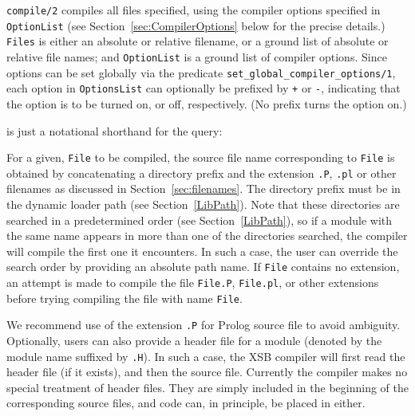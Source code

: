 \begin{description}
%
{\tt compile/2} compiles all files specified, using the compiler
options specified in {\tt OptionList} (see
Section~\ref{sec:CompilerOptions} below for the precise details.)
{\tt Files} is either an absolute or relative filename, or a ground
list of absolute or relative file names; and {\tt OptionList} is a
ground list of compiler options.  Since options can be set globally
via the predicate {\tt set\_global\_compiler\_options/1}, each option
in {\tt OptionsList} can optionally be prefixed by \verb|+| or
\verb|-|, indicating that the option is to be turned on, or off,
respectively.  (No prefix turns the option on.)


\noindent
is just a notational shorthand for the query:



For a given, {\tt File} to be compiled, the source file name
corresponding to {\tt File} is obtained by concatenating a directory
prefix and the extension {\tt .P}, {\tt .pl} or other filenames as
discussed in Section~\ref{sec:filenames}.  The directory prefix must
be in the dynamic loader path (see Section~\ref{LibPath}).  Note that
these directories are searched in a predetermined order (see
Section~\ref{LibPath}), so if a module with the same name appears in
more than one of the directories searched, the compiler will compile
the first one it encounters.  In such a case, the user can override
the search order by providing an absolute path name.
%
If {\tt File} contains no extension, an attempt is made to compile the
file {\tt File.P}, {\tt File.pl}, or other extensions before trying
compiling the file with name {\tt File}.

We recommend use of the extension {\tt .P} for Prolog source file to
avoid ambiguity.  Optionally, users can also provide a header file for
a module (denoted by the module name suffixed by {\tt .H}).  In such a
case, the XSB compiler will first read the header file (if it
exists), and then the source file.  Currently the compiler makes no
special treatment of header files.  They are simply included in the
beginning of the corresponding source files, and code can, in
principle, be placed in either.  
 

\end{description}
